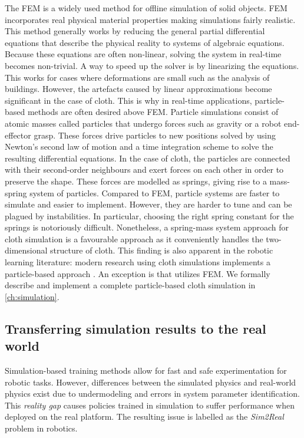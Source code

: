 \documentclass[\home/main.tex]{subfiles}
\begin{document}
The \gls{FEM} is a widely used method for offline simulation of solid objects. \Gls{FEM} incorporates real physical material properties making simulations fairly realistic. This method generally works by reducing the general partial differential equations that describe the physical reality to systems of algebraic equations. Because these equations are often non-linear, solving the system in real-time becomes non-trivial. A way to speed up the solver is by linearizing the equations. This works for cases where deformations are small such as the analysis of buildings. However, the artefacts caused by linear approximations become significant in the case of cloth. This is why in real-time applications, particle-based methods are often desired above \gls{FEM}. Particle simulations consist of atomic masses called particles that undergo forces such as gravity or a robot end-effector grasp. These forces drive particles to new positions solved by using Newton's second law of motion and a time integration scheme to solve the resulting differential equations. In the case of cloth, the particles are connected with their second-order neighbours and exert forces on each other in order to preserve the shape. These forces are modelled as springs, giving rise to a mass-spring system of particles. Compared to \gls{FEM}, particle systems are faster to simulate and easier to implement. However, they are harder to tune and can be plagued by instabilities. In particular, choosing the right spring constant for the springs is notoriously difficult. Nonetheless, a spring-mass system approach for cloth simulation is a favourable approach as it conveniently handles the two-dimensional structure of cloth. This finding is also apparent in the robotic learning literature: modern research using cloth simulations implements a particle-based approach \autocite{Matas2018,seita2021learning,dedo,softgym}. An exception is \autocite{liang2019differentiable} that utilizes \gls{FEM}. We formally describe and implement a complete particle-based cloth simulation in \cref{ch:simulation}.

\subsection{Transferring simulation results to the real world}  \label{sec:lit_sim2real}

Simulation-based training methods allow for fast and safe experimentation for robotic tasks. However, differences between the simulated physics and real-world physics exist due to undermodeling and errors in system parameter identification. This \emph{reality gap} causes policies trained in simulation to suffer performance when deployed on the real platform. The resulting issue is labelled as the \emph{Sim2Real} problem in robotics.
\end{document}
